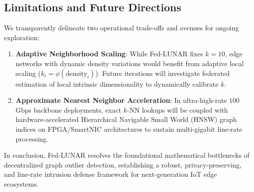 \subsection{Limitations and Future Directions}
\label{subsec:future_work}

We transparently delineate two operational trade-offs and avenues for ongoing exploration:
\begin{enumerate}
    \item \textbf{Adaptive Neighborhood Scaling}: While Fed-LUNAR fixes $k = 10$, edge networks with dynamic density variations would benefit from adaptive local scaling ($k_i = \phi(\text{density}_i)$). Future iterations will investigate federated estimation of local intrinsic dimensionality to dynamically calibrate $k$.
    \item \textbf{Approximate Nearest Neighbor Acceleration}: In ultra-high-rate $100$\,Gbps backbone deployments, exact $k$-NN lookups will be coupled with hardware-accelerated Hierarchical Navigable Small World (HNSW) graph indices on FPGA/SmartNIC architectures to sustain multi-gigabit line-rate processing.
\end{enumerate}

In conclusion, Fed-LUNAR resolves the foundational mathematical bottlenecks of decentralized graph outlier detection, establishing a robust, privacy-preserving, and line-rate intrusion defense framework for next-generation IoT edge ecosystems.
